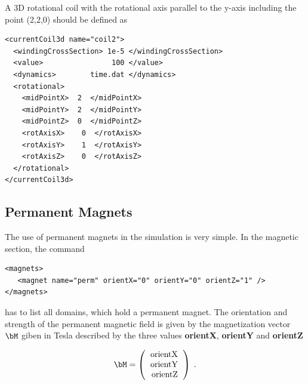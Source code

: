 A 3D rotational coil with the rotational axis parallel to the y-axis
including the point (2,2,0) should be defined as

\begin{verbatim}
<currentCoil3d name="coil2">
  <windingCrossSection> 1e-5 </windingCrossSection>
  <value>                100 </value>
  <dynamics>        time.dat </dynamics>
  <rotational>
    <midPointX>  2  </midPointX>
    <midPointY>  2  </midPointY>
    <midPointZ>  0  </midPointZ>
    <rotAxisX>    0  </rotAxisX>
    <rotAxisY>    1  </rotAxisY>
    <rotAxisZ>    0  </rotAxisZ>
  </rotational>
</currentCoil3d>
\end{verbatim}


\subsection{Permanent Magnets}
The use of permanent magnets in the simulation is very simple. In the
magnetic section, the command

\begin{verbatim}
<magnets>
   <magnet name="perm" orientX="0" orientY="0" orientZ="1" />
</magnets>
\end{verbatim}
has to list all domains, which hold a permanent magnet. The
orientation and strength of the permanent magnetic field is given by
the magnetization vector $\bM$ giben in Tesla described by the three
values {\bf orientX}, {\bf orientY} and {\bf orientZ}

\begin{equation}
  \label{eq:M}
  \bM = \left(
    \begin{tabular}{r}
      orientX\\
      orientY\\
      orientZ
    \end{tabular}
\right) \; .
\end{equation}

